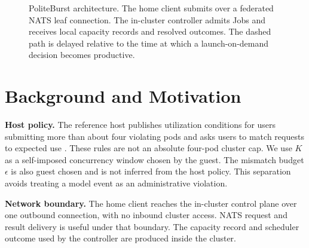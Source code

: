 \documentclass[10pt,conference,letterpaper]{IEEEtran}
\newcommand{\sysname}{PoliteBurst}
\begin{document}
\begin{figure}[t]
\centering
{}
\caption{\sysname{} architecture. The home client submits over a federated NATS
leaf connection. The in-cluster controller admits Jobs and receives local
capacity records and resolved outcomes. The dashed path is delayed relative to
the time at which a launch-on-demand decision becomes productive.}
\label{fig:arch}
\end{figure}

\section{Background and Motivation}
\label{sec:bg}
\textbf{Host policy.}
The reference host publishes utilization conditions for users submitting more
than about four violating pods and asks users to match requests to expected use
\cite{nrppolicy}. These rules are not an absolute four-pod cluster cap. We use
$K$ as a self-imposed concurrency window chosen by the guest. The mismatch budget
$\epsilon$ is also guest chosen and is not inferred from the host policy. This
separation avoids treating a model event as an administrative violation.

\textbf{Network boundary.}
The home client reaches the in-cluster control plane over one outbound connection,
with no inbound cluster access. NATS request and result delivery is useful under
that boundary. The capacity record and scheduler outcome used by the controller
are produced inside the cluster.
\end{document}
